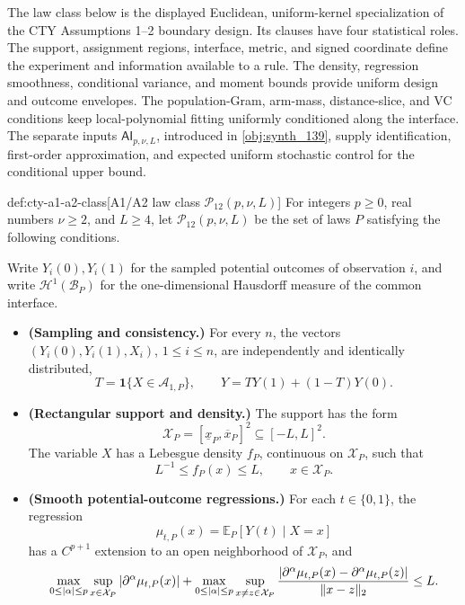 The law class below is the displayed Euclidean, uniform-kernel specialization of the CTY Assumptions 1--2 boundary design. Its clauses have four statistical roles. The support, assignment regions, interface, metric, and signed coordinate define the experiment and information available to a rule. The density, regression smoothness, conditional variance, and moment bounds provide uniform design and outcome envelopes. The population-Gram, arm-mass, distance-slice, and VC conditions keep local-polynomial fitting uniformly conditioned along the interface. The separate inputs \(\mathsf{AI}_{p,\nu,L}\), introduced in \cref{obj:synth_139}, supply identification, first-order approximation, and expected uniform stochastic control for the conditional upper bound.

\begin{definitionv}{def:cty-a1-a2-class}[A1/A2 law class \(\mathcal P_{12}(p,\nu,L)\)]
For integers \(p\geq0\), real numbers \(\nu\geq2\), and \(L\geq4\), let \(\mathcal P_{12}(p,\nu,L)\) be the set of laws \(P\) satisfying the following conditions.

Write \(Y_i(0),Y_i(1)\) for the sampled potential outcomes of observation \(i\), and write \(\mathcal H^1(\mathcal B_P)\) for the one-dimensional Hausdorff measure of the common interface.

\begin{itemize}
\item \textbf{(Sampling and consistency.)} For every \(n\), the vectors \((Y_i(0),Y_i(1),X_i)\), \(1\leq i\leq n\), are independently and identically distributed,
\[
T=\mathbf 1\{X\in\mathcal A_{1,P}\},
\qquad
Y=TY(1)+(1-T)Y(0).
\]

\item \textbf{(Rectangular support and density.)} The support has the form
\[
\mathcal X_P=[\underline x_P,\overline x_P]^2\subseteq[-L,L]^2.
\]
The variable \(X\) has a Lebesgue density \(f_P\), continuous on \(\mathcal X_P\), such that
\[
L^{-1}\leq f_P(x)\leq L,
\qquad x\in\mathcal X_P.
\]

\item \textbf{(Smooth potential-outcome regressions.)} For each \(t\in\{0,1\}\), the regression
\[
\mu_{t,P}(x)=\mathbb E_P[Y(t)\mid X=x]
\]
has a \(C^{p+1}\) extension to an open neighborhood of \(\mathcal X_P\), and
\[
\max_{0\leq|\alpha|\leq p}\sup_{x\in\mathcal X_P}|\partial^\alpha\mu_{t,P}(x)|
+
\max_{0\leq|\alpha|\leq p}\sup_{x\neq z\in\mathcal X_P}
{|\partial^\alpha\mu_{t,P}(x)-\partial^\alpha\mu_{t,P}(z)|
\over
\lVert x-z\rVert_2}
\leq L.
\]


\end{itemize}
\end{definitionv}
